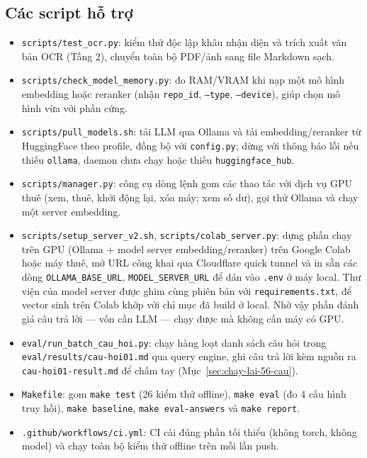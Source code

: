 \subsection{Các script hỗ trợ}

\begin{itemize}
  \item \texttt{scripts/test\_ocr.py}: kiểm thử độc lập khâu nhận diện và trích xuất văn bản OCR (Tầng 2), chuyển toàn bộ PDF/ảnh sang file Markdown sạch.
  \item \texttt{scripts/check\_model\_memory.py}: đo RAM/VRAM khi nạp một mô hình embedding hoặc reranker (nhận \texttt{repo\_id}, \texttt{--type}, \texttt{--device}), giúp chọn mô hình vừa với phần cứng.
  \item \texttt{scripts/pull\_models.sh}: tải LLM qua Ollama và tải embedding/reranker từ HuggingFace theo profile, đồng bộ với \texttt{config.py}; dừng với thông báo lỗi nếu thiếu \texttt{ollama}, daemon chưa chạy hoặc thiếu \texttt{huggingface\_hub}.
  \item \texttt{scripts/manager.py}: công cụ dòng lệnh gom các thao tác với dịch vụ GPU thuê (xem, thuê, khởi động lại, xóa máy; xem số dư), gọi thử Ollama và chạy một server embedding.
  \item \texttt{scripts/setup\_server\_v2.sh}, \texttt{scripts/colab\_server.py}: dựng phần chạy trên GPU
        (Ollama + model server embedding/reranker) trên Google Colab hoặc máy thuê, mở URL công khai
        qua Cloudflare quick tunnel và in sẵn các dòng \texttt{OLLAMA\_BASE\_URL}, \texttt{MODEL\_SERVER\_URL}
        để dán vào \texttt{.env} ở máy local. Thư viện của model server được ghim cùng phiên bản với
        \texttt{requirements.txt}, để vector sinh trên Colab khớp với chỉ mục đã build ở local. Nhờ vậy
        phần đánh giá câu trả lời --- vốn cần LLM --- chạy được mà không cần máy có GPU.
  \item \texttt{eval/run\_batch\_cau\_hoi.py}: chạy hàng loạt danh sách câu hỏi trong
        \texttt{eval/results/cau-hoi01.md} qua query engine, ghi câu trả lời kèm nguồn ra
        \texttt{cau-hoi01-result.md} để chấm tay (Mục~\ref{sec:chay-lai-56-cau}).
  \item \texttt{Makefile}: gom \texttt{make test} (26 kiểm thử offline), \texttt{make eval} (đo 4 cấu hình truy hồi), \texttt{make baseline}, \texttt{make eval-answers} và \texttt{make report}.
  \item \texttt{.github/workflows/ci.yml}: CI cài đúng phần tối thiểu (không torch, không model) và chạy toàn bộ kiểm thử offline trên mỗi lần push.
\end{itemize}


